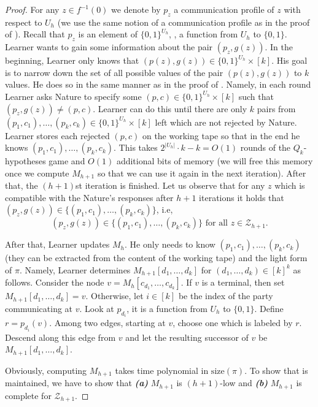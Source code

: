 \begin{proof}
For any $z\in f^{-1}(0)$ we denote by $p_z$  a communication profile of $z$ with respect to $U_h$ (we use the same notion of a communication profile as in the proof of ). Recall that $p_z$ is an element of $\{0, 1\}^{U_h}$, \ie, a function from $U_h$ to $\{0, 1\}$. Learner wants to gain some information about the pair $(p_z, g(z))$. In the beginning, Learner only knows that $(p(z), g(z)) \in \{0,1\}^{U_h}\times[k]$. His goal is to narrow down the set of all possible values of the pair $(p(z), g(z))$ to $k$ values. 
%
 He does so in the same manner as in the proof of .  %
Namely, in each round Learner asks Nature to specify some $(p, c)\in \{0,1\}^{U_h}\times[k]$ such that $(p_z, g(z)) \neq (p, c)$. Learner can do this until there are only $k$ pairs from $(p_1, c_1), \ldots, (p_k, c_k)\in \{0, 1\}^{U_h} \times [k]$ left which are not rejected by Nature. Learner stores each rejected $(p, c)$ on the working tape so that in the end he knows $(p_1, c_1), \ldots, (p_k, c_k)$.  %
 This takes $2^{|U_h|} \cdot k - k = O(1)$ rounds of the $Q_k$-hypotheses game and $O(1)$ additional bits of memory (we will free this memory once we compute $M_{h+1}$ so that we can use it again in the next iteration). After that, the $(h+1)$st iteration is finished. Let us observe that for any $z$ which is compatible with the Nature's responses after $h + 1$ iterations it holds that $(p_z, g(z)) \in\{(p_1, c_1), \ldots, (p_k, c_k)\}$, i.e,   
\begin{equation}
\label{h_equation}
(p_z, g(z)) \in \{(p_1, c_1), \ldots, (p_k, c_k)\} \mbox{ for all } z\in\mathcal{Z}_{h + 1}.
\end{equation}

After that, Learner updates $M_h$. He only needs to know $(p_1, c_1), \ldots, (p_k, c_k)$ (they can be extracted from the content of the working tape) and the light form of $\pi$. Namely, Learner determines $M_{h + 1}[d_1, \ldots, d_k]$ for $(d_1, \ldots, d_k) \in [k]^k$ as follows. Consider the node $v = M_h[c_{d_1}, \ldots, c_{d_k}]$. If $v$ is a terminal, then set $M_{h + 1}[d_1, \ldots, d_k] = v$. Otherwise, let $i\in [k]$ be the index of the party communicating at $v$. Look at $p_{d_i}$, it is a function from $U_h$ to $\{0, 1\}$. Define $r = p_{d_i}(v)$. Among two edges, starting at $v$, choose one which is labeled by $r$. Descend along this edge from $v$ and let the resulting successor of $v$ be $M_{h + 1}[d_1, \ldots, d_k]$.

Obviously, computing $M_{h + 1}$ takes time polynomial in $\mathrm{size}(\pi)$.
To show that  is maintained, we have to show that \textbf{\emph{(a)}} $M_{h + 1}$ is $(h + 1)$-low and \textbf{\emph{(b)}} $M_{h + 1}$ is complete for $\mathcal{Z}_{h + 1}$.


\end{proof}
